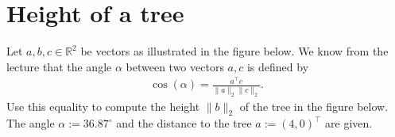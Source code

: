 \section{Height of a tree}
Let $a,b,c \in \mathbb{R}^2$ be vectors as illustrated in the figure below. We know from the lecture that the angle $\alpha$ between two vectors $a,c$ is defined by
\begin{align*}
\cos(\alpha) = \frac{a^\top c}{\| a\|_2 \|c \|_2}.
\end{align*}
Use this equality to compute the height $\| b \|_2$ of the tree in the figure below. The angle $\alpha := 36.87^{\circ}$ and the distance to the tree $ a := (4, 0)^\top$ are given.\\

